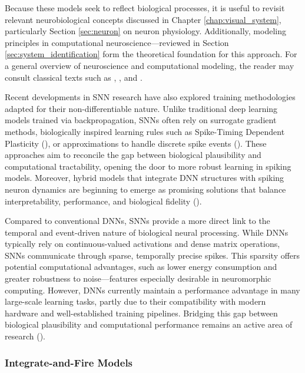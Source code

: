 Because these models seek to reflect biological processes, it is useful to revisit relevant neurobiological concepts discussed in Chapter \ref{chap:visual_system}, particularly Section \ref{sec:neuron} on neuron physiology. Additionally, modeling principles in computational neuroscience—reviewed in Section \ref{sec:system_identification} form the theoretical foundation for this approach. For a general overview of neuroscience and computational modeling, the reader may consult classical texts such as \citet{bear2020neuroscience}, \citet{dayan2005theoretical}, and \citet{gerstner2002spiking}.

Recent developments in SNN research have also explored training methodologies adapted for their non-differentiable nature. Unlike traditional deep learning models trained via backpropagation, SNNs often rely on surrogate gradient methods, biologically inspired learning rules such as Spike-Timing Dependent Plasticity (\citet{Bi1998synaptic, caporale2008hebbian}), or approximations to handle discrete spike events (\citet{haslinger2010discrete}). These approaches aim to reconcile the gap between biological plausibility and computational tractability, opening the door to more robust learning in spiking models. Moreover, hybrid models that integrate DNN structures with spiking neuron dynamics are beginning to emerge as promising solutions that balance interpretability, performance, and biological fidelity (\citet{Eshraghian2023trainsnn, lee_training_2016}).

Compared to conventional DNNs, SNNs provide a more direct link to the temporal and event-driven nature of biological neural processing. While DNNs typically rely on continuous-valued activations and dense matrix operations, SNNs communicate through sparse, temporally precise spikes. This sparsity offers potential computational advantages, such as lower energy consumption and greater robustness to noise—features especially desirable in neuromorphic computing. However, DNNs currently maintain a performance advantage in many large-scale learning tasks, partly due to their compatibility with modern hardware and well-established training pipelines. Bridging this gap between biological plausibility and computational performance remains an active area of research (\citet{Eshraghian2023trainsnn}).

\subsubsection{Integrate-and-Fire Models}
\label{subsubsec:integrate_and_fire}

